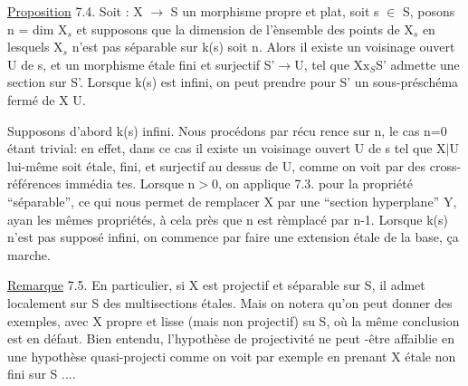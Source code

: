 

\uline{Proposition} 7.4. Soit : X $\longrightarrow$ S un morphisme propre et plat, 
soit s $\in$ S,  posons n = dim X$_{s}$ et supposons que la dimension de
l'ènsemble des points de X$_{s}$ en lesquels X$_{s}$ n'est pas séparable sur k(s)
soit \hand{$<$} n. Alors il existe un voisinage ouvert U de s, et un morphisme
étale fini et surjectif S'$\longrightarrow$U, tel que X$\mathrm{x}_{S}$S' admette une section sur S'.
Lorsque k(s) est infini, on peut prendre pour S' un sous-préschéma fermé
de X U.

Supposons d'abord k(s) infini. Nous  procédons par récu%
rence sur n, le cas n=0 étant trivial: en effet, dans ce cas il existe
un voisinage ouvert U de s tel que X$|$U lui-même soit étale, fini, et
surjectif au dessus de U, comme on voit par des cross-références immédia
tes. Lorsque n$>$0, on applique 7.3. pour la propriété ``séparable'', ce qui
nous permet de  remplacer X par une ``section hyperplane'' Y, ayan
les mêmes propriétés, à cela près que n est rèmplacé par n-1. Lorsque
k(s) n'est pas supposé infini, on commence par faire une extension étale
de la base, ça marche.

\uline{Remarque} 7.5. En particulier, si X est projectif et séparable sur S,
il admet localement sur S des multisections étales. Mais on notera qu'on
peut donner des exemples, avec X propre et lisse (mais non projectif) su
S, où la même conclusion est en défaut. Bien entendu, l'hypothèse de
 projectivité ne peut -être affaiblie  en une hypothèse quasi-projecti
comme on voit par exemple en prenant X étale non fini sur S ....


